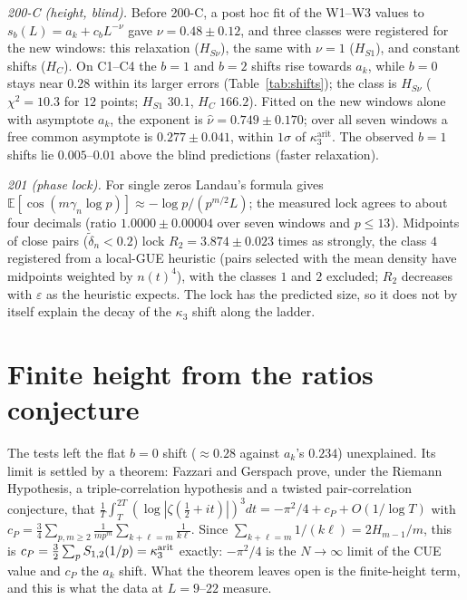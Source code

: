 \documentclass[12pt]{amsart}
\theoremstyle{remark}
\newcommand{\E}{\mathbb{E}}
\newcommand{\eps}{\varepsilon}
\newcommand{\1}{\mathbf{1}}
\begin{document}
\emph{200-C (height, blind).} Before 200-C, a post hoc fit of the
W1--W3 values to $s_b(L)=a_k+c_bL^{-\nu}$ gave $\nu=0.48\pm0.12$, and three
classes were registered for the new windows: this relaxation ($H_{S\nu}$),
the same with $\nu=1$ ($H_{S1}$), and constant shifts ($H_C$). On C1--C4
the $b=1$ and $b=2$ shifts rise towards $a_k$, while $b=0$ stays near
$0.28$ within its larger errors (Table~\ref{tab:shifts}); the class is
$H_{S\nu}$ ($\chi^2=10.3$ for $12$ points; $H_{S1}$ $30.1$, $H_C$ $166.2$).
Fitted on the new windows alone with asymptote $a_k$, the exponent is
$\hat\nu=0.749\pm0.170$; over all seven windows a free common asymptote is
$0.277\pm0.041$, within $1\sigma$ of $\kappa_3^{\mathrm{arit}}$. The
observed $b=1$ shifts lie $0.005$--$0.01$ above the blind predictions
(faster relaxation).

\emph{201 (phase lock).} For single zeros Landau's formula
\cite{Landau12,Gonek93} gives $\E[\cos(m\gamma_n\log p)]\approx-\log
p/(p^{m/2}L)$; the measured lock agrees to about four decimals (ratio
$1.0000\pm0.00004$ over seven windows and $p\le13$). Midpoints of close
pairs ($\tilde\delta_n<0.2$) lock $R_2=3.874\pm0.023$ times as strongly,
the class $4$ registered from a local-GUE heuristic (pairs selected with
the mean density have midpoints weighted by $n(t)^4$), with the classes $1$
and $2$ excluded; $R_2$ decreases with $\eps$ as the heuristic expects. The
lock has the predicted size, so it does not by itself explain the decay of
the $\kappa_3$ shift along the ladder.

\section{Finite height from the ratios conjecture}\label{sec:ratios}

The tests left the flat $b=0$ shift ($\approx0.28$ against $a_k$'s
$0.234$) unexplained. Its limit is settled by a theorem: Fazzari and
Gerspach \cite{FG24} prove, under the Riemann Hypothesis, a
triple-correlation hypothesis and a twisted pair-correlation conjecture,
that
$\frac1T\int_T^{2T}(\log|\zeta(\tfrac12+it)|)^3dt=-\pi^2/4+c_P+O(1/\log T)$
with $c_P=\frac34\sum_{p,m\ge2}\frac1{mp^m}\sum_{k+\ell=m}\frac1{k\ell}$.
Since $\sum_{k+\ell=m}1/(k\ell)=2H_{m-1}/m$, this is
$c_P=\frac32\sum_pS_{1,2}(1/p)=\kappa_3^{\rm arit}$ exactly: $-\pi^2/4$ is
the $N\to\infty$ limit of the CUE value and $c_P$ the $a_k$ shift. What the
theorem leaves open is the finite-height term, and this is what the data
at $L=9$--$22$ measure.
\end{document}
